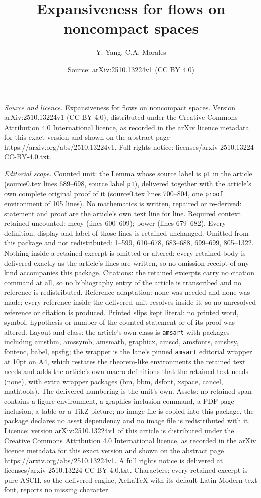\documentclass[10pt,a4paper]{amsart}
\title[Expansiveness for flows on noncompact spaces]{Expansiveness for flows on noncompact spaces}
\author{Y. Yang, C.A. Morales}
\date{Source: arXiv:2510.13224v1 (CC BY 4.0)}
\begin{document}
\maketitle

\noindent\emph{Source and licence.} Expansiveness for flows on noncompact spaces. Version arXiv:2510.13224v1 (CC BY 4.0), distributed under the Creative Commons Attribution 4.0 International licence, as recorded in the arXiv licence metadata for this exact version and shown on the abstract page https://arxiv.org/abs/2510.13224v1. Full rights notice: licenses/arxiv-2510.13224-CC-BY-4.0.txt.\par\smallskip

\noindent\textit{Editorial scope.} Counted unit: the Lemma whose source label is \texttt{p1} in the article (source0.tex lines 689--698, source label \texttt{p1}), delivered together with the article's own complete original proof of it (source0.tex lines 700--804, one \texttt{proof} environment of 105 lines). No mathematics is written, repaired or re-derived: statement and proof are the article's own text line for line. Required context retained uncounted: mcoy (lines 600--609); power (lines 679--682). Every definition, display and label of those lines is retained unchanged. Omitted from this package and not redistributed: 1--599, 610--678, 683--688, 699--699, 805--1322. Nothing inside a retained excerpt is omitted or altered: every retained body is delivered exactly as the article's lines are written, so no omission receipt of any kind accompanies this package. Citations: the retained excerpts carry no citation command at all, so no bibliography entry of the article is transcribed and no reference is redistributed. Reference adaptation: none was needed and none was made; every reference inside the delivered unit resolves inside it, so no unresolved reference or citation is produced. Printed slips kept literal: no printed word, symbol, hypothesis or number of the counted statement or of its proof was altered. Layout and class: the article's own class is \texttt{amsart} with packages including amsthm, amssymb, amsmath, graphicx, amscd, amsfonts, amsbsy, fontenc, babel, epsfig; the wrapper is the lane's pinned \texttt{amsart} editorial wrapper at 10pt on A4, which restates the theorem-like environments the retained text needs and adds the article's own macro definitions that the retained text needs (none), with extra wrapper packages (bm, bbm, dsfont, xspace, cancel, mathtools). The delivered numbering is the unit's own. Assets: no retained span contains a figure environment, a graphics-inclusion command, a PDF-page inclusion, a table or a TikZ picture; no image file is copied into this package, the package declares no asset dependency and no image file is redistributed with it. Licence: version arXiv:2510.13224v1 of this article is distributed under the Creative Commons Attribution 4.0 International licence, as recorded in the arXiv licence metadata for this exact version and shown on the abstract page https://arxiv.org/abs/2510.13224v1. A full rights notice is delivered at licenses/arxiv-2510.13224-CC-BY-4.0.txt. Characters: every retained excerpt is pure ASCII, so the delivered engine, XeLaTeX with its default Latin Modern text font, reports no missing character.
\end{document}
